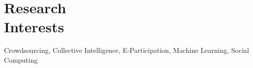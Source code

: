
\section{Research\\Interests}
\par
Crowdsourcing, Collective Intelligence, E-Participation, Machine Learning, Social Computing